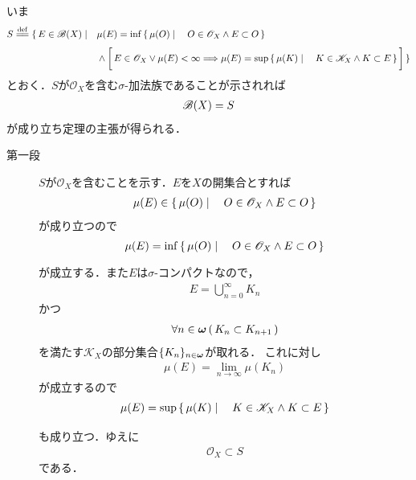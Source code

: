 		\begin{sketch}
			いま
			\begin{align}
				S \defeq \{\, E \in \borel{X} \mid \quad &
				\mu(E) = \inf{}{\Set{\mu(O)}{O \in \mathscr{O}_X \wedge E \subset O}} \\
				&\wedge \left[\, E \in \mathscr{O}_X \vee \mu(E) < \infty 
					\Longrightarrow
					\mu(E) = \sup{}{\Set{\mu(K)}{K \in \mathscr{K}_X \wedge K \subset E}}\, \right]\, \}
			\end{align}
			とおく．$S$が$\mathscr{O}_X$を含む$\sigma$-加法族であることが示されれば
			\begin{align}
				\mathscr{B}(X) = S
			\end{align}
			が成り立ち定理の主張が得られる．
			\begin{description}
				\item[第一段] $S$が$\mathscr{O}_X$を含むことを示す．$E$を$X$の開集合とすれば
					\begin{align}
						\mu(E) \in \left\{\, \mu(O) \mid \quad O \in \mathscr{O}_X \wedge E \subset O\, \right\}
					\end{align}
					が成り立つので
					\begin{align}
						\mu(E) = \operatorname*{inf}_{} \left\{\, \mu(O) \mid \quad O \in \mathscr{O}_X \wedge E \subset O\, \right\}
					\end{align}
					が成立する．また$E$は$\sigma$-コンパクトなので，
					\begin{align}
						E = \bigcup_{n=0}^\infty K_n
					\end{align}
					かつ
					\begin{align}
						\forall n \in {\boldsymbol \omega}\, (\, K_n \subset K_{n+1}\, )
					\end{align}
					を満たす$\mathscr{K}_X$の部分集合$\{K_n\}_{n \in {\boldsymbol \omega}}$が取れる．
					これに対し
					\begin{align}
						\mu(E) = \lim_{n \to \infty} \mu(K_n)
					\end{align}
					が成立するので
					\begin{align}
						\mu(E) = \operatorname*{sup}_{} \left\{\, \mu(K) \mid \quad K \in \mathscr{K}_X \wedge K \subset E\, \right\}
					\end{align}
					も成り立つ．ゆえに
					\begin{align}
						\mathscr{O}_X \subset S
					\end{align}
					である．
					

\end{description}
\end{sketch}

